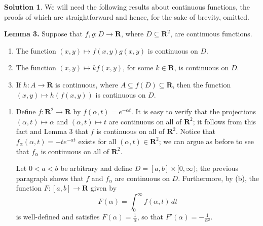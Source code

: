 \documentclass[12pt]{article}
\theoremstyle{definition}
\theoremstyle{exercise}
\theoremstyle{solution}
\newtheorem*{solution}{Solution}
\newcommand{\R}{\mathbf{R}}
\begin{document}
\begin{solution}
    We will need the following results about continuous functions, the proofs of which are straightforward and hence, for the sake of brevity, omitted.
    \begin{tcolorbox}
        \textbf{Lemma 3.} Suppose that \( f, g : D \to \R \), where \( D \subseteq \R^2 \), are continuous functions.
        \begin{enumerate}[label=(\roman*)]
            \item The function \( (x, y) \mapsto f(x, y) g(x, y) \) is continuous on \( D \).

            \item The function \( (x, y) \mapsto k f(x, y) \), for some \( k \in \R \), is continuous on \( D \).

            \item If \( h : A \to \R \) is continuous, where \( A \subseteq f(D) \subseteq \R \), then the function \( (x, y) \mapsto h(f(x, y)) \) is continuous on \( D \).
        \end{enumerate}
    \end{tcolorbox}


    \begin{enumerate}
        \item Define \( f : \R^2 \to \R \) by \( f(\alpha, t) = e^{-\alpha t} \). It is easy to verify that the projections \( (\alpha, t) \mapsto \alpha \) and \( (\alpha, t) \mapsto t \) are continuous on all of \( \R^2 \); it follows from this fact and Lemma 3 that \( f \) is continuous on all of \( \R^2 \). Notice that \( f_{\alpha}(\alpha, t) = -t e^{-\alpha t} \) exists for all \( (\alpha, t) \in \R^2 \); we can argue as before to see that \( f_{\alpha} \) is continuous on all of \( \R^2 \).

        Let \( 0 < a < b \) be arbitrary and define \( D = [a, b] \times [0, \infty) \); the previous paragraph shows that \( f \) and \( f_{\alpha} \) are continuous on \( D \). Furthermore, by  (b), the function \( F : [a, b] \to \R \) given by
        \[
            F(\alpha) = \int_0^{\infty} f(\alpha, t) \, dt
        \]
        is well-defined and satisfies \( F(\alpha) = \tfrac{1}{\alpha} \), so that \( F'(\alpha) = -\tfrac{1}{\alpha^2} \).


\end{enumerate}
\end{solution}
\end{document}
